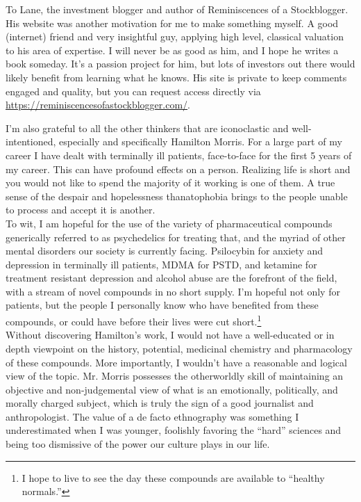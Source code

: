 To Lane, the investment blogger and author of Reminiscences of a Stockblogger. His website was another motivation for me to make something myself. A good (internet) friend and very insightful guy, applying high level, classical valuation to his area of expertise. I will never be as good as him, and I hope he writes a book someday. It's a passion project for him, but lots of investors out there would likely benefit from learning what he knows. His site is private to keep comments engaged and quality, but you can request access directly via \url{https://reminiscencesofastockblogger.com/}.

I'm also grateful to all the other thinkers that are iconoclastic and well-intentioned, especially and specifically Hamilton Morris. For a large part of my career I have dealt with terminally ill patients, face-to-face for the first 5 years of my career. This can have profound effects on a person. Realizing life is short and you would not like to spend the majority of it working is one of them. A true sense of the despair and hopelessness thanatophobia brings to the people unable to process and accept it is another.\\

To wit, I am hopeful for the use of the variety of pharmaceutical compounds generically referred to as psychedelics for treating that, and the myriad of other mental disorders our society is currently facing. Psilocybin for anxiety and depression in terminally ill patients, MDMA for PSTD, and ketamine for treatment resistant depression and alcohol abuse are the forefront of the field, with a stream of novel compounds in no short supply. I'm hopeful not only for patients, but the people I personally know who have benefited from these compounds, or could have before their lives were cut short.\footnote{I hope to live to see the day these compounds are available to “healthy normals.”}\\

Without discovering Hamilton's work, I would not have a well-educated or in depth viewpoint on the history, potential, medicinal chemistry and pharmacology of these compounds. More importantly, I wouldn't have a reasonable and logical view of the topic. Mr. Morris possesses the otherworldly skill of maintaining an objective and non-judgemental view of what is an emotionally, politically, and morally charged subject, which is truly the sign of a good journalist and anthropologist. The value of a de facto ethnography was something I underestimated when I was younger, foolishly favoring the “hard” sciences and being too dismissive of the power our culture plays in our life.\\ 

